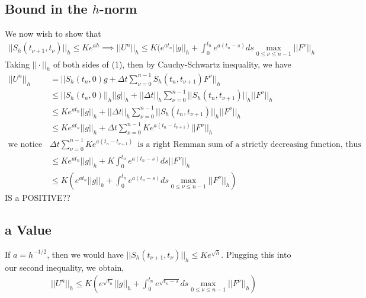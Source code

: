 \subsection{Bound in the $h$-norm}
We now wish to show that 
\begin{align*}
||S_h(t_{\nu+1},t_{\nu})||_h \leq Ke^{ah} \implies ||U^n||_h \leq K(e^{at_n} ||g||_h + \int_0^{t_n} e^{a(t_n-s)} ds \max_{0\leq \nu \leq n-1} ||F^{\nu}||_h
\end{align*}
Taking $||\cdot ||_h$ of both sides of (1), then by Cauchy-Schwartz inequality, we have
\begin{align*}
||U^n||_h &= ||S_h(t_n,0)g+\Delta t \sum_{\nu = 0}^{n-1} S_h(t_n , t_{\nu + 1}) F^{\nu} ||_h \\
&\leq ||S_h(t_n,0)||_h||g||_h+||\Delta t||_h \sum_{\nu = 0}^{n-1} ||S_h(t_n , t_{\nu + 1})||_h || F^{\nu} ||_h \\
&\leq Ke^{at_n}||g||_h+||\Delta t||_h \sum_{\nu = 0}^{n-1} ||S_h(t_n , t_{\nu + 1})||_h || F^{\nu} ||_h\\
&\leq Ke^{at_n}||g||_h+\Delta t \sum_{\nu = 0}^{n-1} Ke^{a(t_n - t_{\nu+1})} || F^{\nu} ||_h\\ 
\text{we notice that} \enspace & \Delta t \sum_{\nu = 0}^{n-1} Ke^{a(t_n - t_{\nu+1})} \enspace \text{is a right Remman sum of a strictly decreasing function, thus} \\
&\leq Ke^{at_n}||g||_h+ K\int_0^{t_n} e^{a(t_n - s)} ds || F^{\nu} ||_h\\ 
&\leq K(e^{at_n}||g||_h+ \int_0^{t_n} e^{a(t_n - s)} ds \max_{0\leq \nu \leq n-1} ||F^{\nu}||_h)
\end{align*}
IS a POSITIVE??
\subsection{a Value}
If $a = h^{-1/2}$, then we would have $||S_h(t_{\nu + 1}, t_{\nu})||_h \leq Ke^{\sqrt{h}}$. Plugging this into our second inequality, we obtain, 
\begin{align*}
||U^n||_h\leq K(e^{\sqrt{t_n}}||g||_h+ \int_0^{t_n} e^{\sqrt{t_n - s}} ds \max_{0\leq \nu \leq n-1} ||F^{\nu}||_h)
\end{align*}